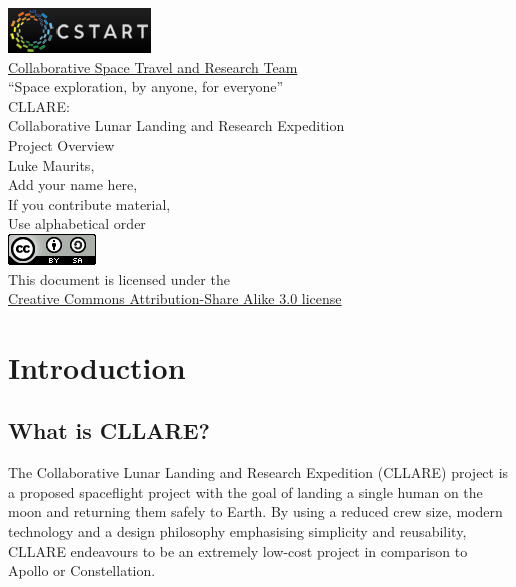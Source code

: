 \documentclass{report}
\begin{document}
\begin{titlepage}
\centering
\includegraphics{images/cstart_logo} \\
\Large{\href{http://www.cstart.org}{Collaborative Space Travel and Research Team}} \\
\vspace{0.5cm}
\large{``Space exploration, by anyone, for everyone''} \\
\vspace{4.0cm}
\Large{CLLARE:} \\
\Large{Collaborative Lunar Landing and Research Expedition} \\
\Large{Project Overview} \\
\vspace{2.0cm}
\normalsize{Luke Maurits, \\
Add your name here, \\
If you contribute material, \\
Use alphabetical order} \\
\vspace{4.0cm}
\includegraphics{images/cc_badge} \\
This document is licensed under the \\
\href{http://creativecommons.org/licenses/by-sa/3.0/}{Creative Commons Attribution-Share Alike 3.0 license}
\end{titlepage}

\tableofcontents

\chapter{Introduction}

\section{What is CLLARE?}

The Collaborative Lunar Landing and Research Expedition (CLLARE) project is a proposed spaceflight project with the goal of landing a single human on the moon and returning them safely to Earth.  By using a reduced crew size, modern technology and a design philosophy emphasising simplicity and reusability, CLLARE endeavours to be an extremely low-cost project in comparison to Apollo or Constellation.
\end{document}
